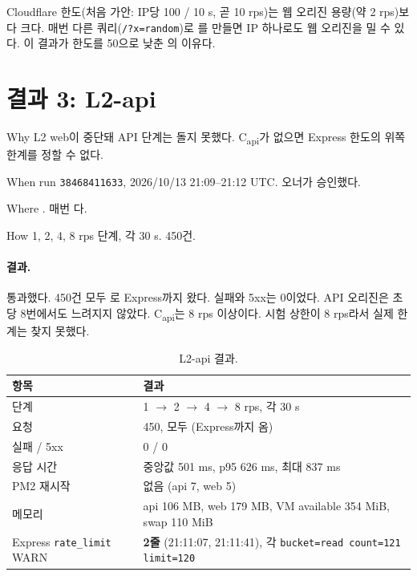 \begin{callout}[새로 드러난 위험]
Cloudflare 한도(처음 가안: IP당 100 / 10 s, 곧 10 rps)는 웹 오리진 용량(약 2 rps)보다 크다.
매번 다른 쿼리(\texttt{/?x=random})로 를 만들면 IP 하나로도 웹 오리진을 밀 수 있다.
이 결과가 한도를 50으로 낮춘 의 이유다.
\end{callout}

\section{결과 3: L2-api}\label{sec:07-result-l2api}

\begin{inbrief}
  \item[Why] L2 web이 중단돼 API 단계는 돌지 못했다. C\textsubscript{api}가 없으면 Express 한도의 위쪽 한계를 정할 수 없다.
  \item[When] run \texttt{38468411633}, 2026/10/13 21:09--21:12 UTC. 오너가 승인했다.
  \item[Where] . 매번 다.
  \item[How] 1, 2, 4, 8 rps 단계, 각 30 s. 450건.
\end{inbrief}

\paragraph{결과.}
통과했다.
450건 모두 로 Express까지 왔다.
실패와 5xx는 0이었다.
API 오리진은 초당 8번에서도 느려지지 않았다.
C\textsubscript{api}는 8 rps 이상이다.
시험 상한이 8 rps라서 실제 한계는 찾지 못했다.

\begin{table}[H]
  \caption{L2-api 결과.}\label{tab:07-l2-api}
  \small
  \begin{tabularx}{\linewidth}{L{3.6cm} Y}
    \toprule
    항목 & 결과 \\
    \midrule
    단계 & 1 $\rightarrow$ 2 $\rightarrow$ 4 $\rightarrow$ 8 rps, 각 30 s \\
    \midrule
    요청 & 450, 모두  (Express까지 옴) \\
    \midrule
    실패 / 5xx & 0 / 0 \\
    \midrule
    응답 시간 & 중앙값 501 ms, p95 626 ms, 최대 837 ms \\
    \midrule
    PM2 재시작 & 없음 (api 7, web 5) \\
    \midrule
    메모리 & api 106 MB, web 179 MB, VM available 354 MiB, swap 110 MiB \\
    \midrule
    Express \texttt{rate\_limit} WARN & \textbf{2줄} (21:11:07, 21:11:41), 각 \texttt{bucket=read count=121 limit=120} \\
    \bottomrule
  \end{tabularx}
\end{table}

